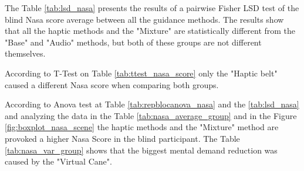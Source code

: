 

The Table \ref{tab:lsd_nasa} presents the results of a pairwise Fisher LSD test of the blind Nasa score average between all the guidance methods. The results show that all the haptic methods and the "Mixture" are statistically different from the "Base" and "Audio" methods, but both of these groups are not different themselves.



According to T-Test on Table \ref{tab:ttest_nasa_score} only the "Haptic belt" caused a different Nasa score when comparing both groups.

According to Anova test at Table \ref{tab:repblocanova_nasa} and the \ref{tab:lsd_nasa} and analyzing the data in the Table \ref{tab:nasa_average_group} and in the Figure \ref{fig:boxplot_nasa_scene} the haptic methods and the "Mixture" method are provoked a higher Nasa Score in the blind participant. The Table \ref{tab:nasa_var_group} shows that the biggest mental demand reduction was caused by the "Virtual Cane".

\FloatBarrier